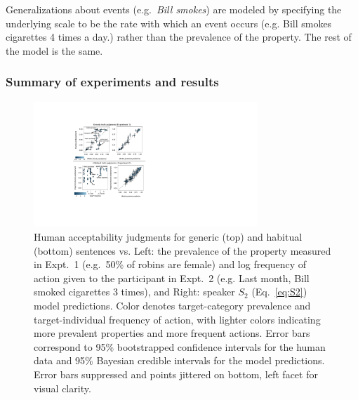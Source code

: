 \documentclass[11pt,letterpaper]{article}
\begin{document}
Generalizations about events (e.g.~\emph{Bill smokes}) are modeled by specifying the underlying scale to be the rate with which an event occurs (e.g. Bill smokes cigarettes 4 times a day.) rather than the prevalence of the property. 
The rest of the model is the same.



 


\subsubsection*{Summary of experiments and results}

\begin{figure}[t]
\centering
  \includegraphics[width=0.75\textwidth]{tj-2x2}
  \caption{Human acceptability judgments for generic (top) and habitual (bottom) sentences vs. Left: the prevalence of the property measured in Expt.~1 (e.g.~50\% of robins are female) and log frequency of action given to the participant in Expt.~2 (e.g. Last month, Bill smoked cigarettes 3 times), and 
  Right: speaker $S_2$ (Eq.~\ref{eq:S2}) model predictions.
  Color denotes target-category prevalence and target-individual frequency of action, with lighter colors indicating more prevalent properties and more frequent actions. 
  Error bars correspond to 95\% bootstrapped confidence intervals for the human data and 95\% Bayesian credible intervals for the model predictions. 
  Error bars suppressed and points jittered on bottom, left facet for visual clarity.}
  \label{fig:tj}
\end{figure}
\end{document}
